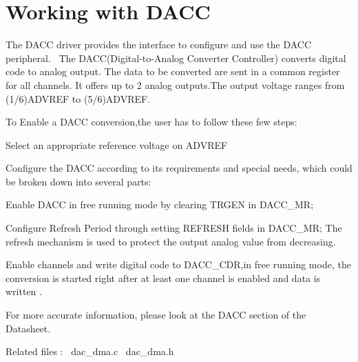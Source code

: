 \hypertarget{group__dacc__module}{}\section{Working with D\+A\+CC}
\label{group__dacc__module}
The D\+A\+CC driver provides the interface to configure and use the D\+A\+CC peripheral.~\newline
 The D\+A\+CC(Digital-\/to-\/\+Analog Converter Controller) converts digital code to analog output. The data to be converted are sent in a common register for all channels. It offers up to 2 analog outputs.\+The output voltage ranges from (1/6)A\+D\+V\+R\+EF to (5/6)A\+D\+V\+R\+EF.

To Enable a D\+A\+CC conversion,the user has to follow these few steps\+: 
\begin{DoxyItemize}
\item Select an appropriate reference voltage on A\+D\+V\+R\+EF  
\item Configure the D\+A\+CC according to its requirements and special needs, which could be broken down into several parts\+:
\begin{DoxyEnumerate}
\item Enable D\+A\+CC in free running mode by clearing T\+R\+G\+EN in D\+A\+C\+C\+\_\+\+MR;
\item Configure Refresh Period through setting R\+E\+F\+R\+E\+SH fields in D\+A\+C\+C\+\_\+\+MR; The refresh mechanism is used to protect the output analog value from decreasing.
\item Enable channels and write digital code to D\+A\+C\+C\+\_\+\+C\+DR,in free running mode, the conversion is started right after at least one channel is enabled and data is written .  
\end{DoxyEnumerate}
\end{DoxyItemize}

For more accurate information, please look at the D\+A\+CC section of the Datasheet.

Related files \+:~\newline
 dac\+\_\+dma.\+c~\newline
 dac\+\_\+dma.\+h~\newline
 
